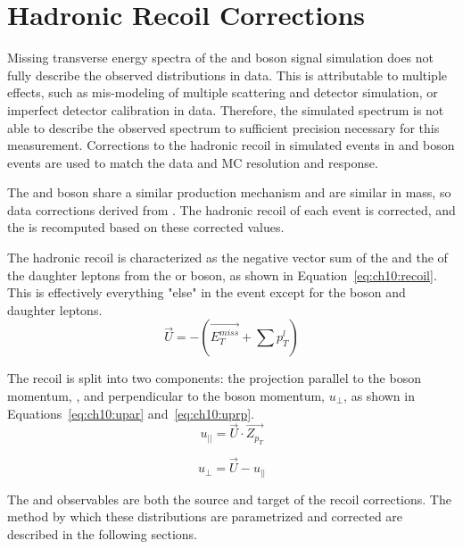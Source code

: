 \chapter{Hadronic Recoil Corrections}\label{ch:recoil}

Missing transverse energy spectra of the \W and \Z boson signal simulation does not fully describe the observed distributions in data. This is attributable to multiple effects, such as mis-modeling of multiple scattering and detector simulation, or imperfect detector calibration in data. Therefore, the simulated \met spectrum is not able to describe the observed \met spectrum to sufficient precision necessary for this measurement. Corrections to the hadronic recoil in simulated events in \W and \Z boson events are used to match the data and MC \met resolution and response. 

The \W and \Z boson share a similar production mechanism and are similar in mass, so data corrections derived from \zmm. The hadronic recoil of each event is corrected, and the \met is recomputed based on these corrected values. 

The hadronic recoil is characterized as the negative vector sum of the \met and the \pt of the daughter leptons from the \W or \Z boson, as shown in Equation~\ref{eq:ch10:recoil}. This is effectively everything "else" in the event except for the \W boson and daughter leptons.
\begin{equation}
\vec{U}=-(\vec{E_T^{miss}}+\sum{p_{T}^l})
    \label{eq:ch10:recoil}
\end{equation}

The recoil is split into two components: the projection parallel to the boson momentum, \upar, and perpendicular to the boson momentum, $u_\perp$, as shown in Equations~\ref{eq:ch10:upar} and~\ref{eq:ch10:uprp}. 
\begin{equation}
    u_{||} = \vec{U}\cdot \vec{Z_{p_T}}
    \label{eq:ch10:upar}
\end{equation}

\begin{equation}
    u_\perp = \vec{U} -  u_{||}
    \label{eq:ch10:uprp}
\end{equation}


The \upar and \uprp observables are both the source and target of the recoil corrections. The method by which these distributions are parametrized and corrected are described in the following sections.



